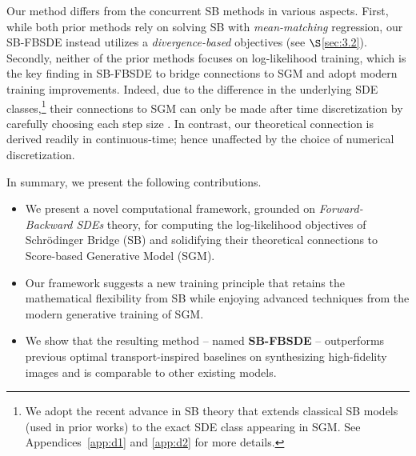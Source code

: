 \documentclass{article}
\begin{document}
{
  Our method differs from the concurrent SB methods \citep{de2021diffusion,vargas2021solving} in various aspects.
  First, while both prior methods rely on solving SB with
  \textit{mean-matching} regression,
  our {SB-FBSDE} instead utilizes a \textit{divergence-based} objectives
  (see $\S$\ref{sec:3.2}).
  Secondly, neither of the prior methods focuses on log-likelihood training,
  which is the key finding in {SB-FBSDE} to bridge connections to SGM and adopt modern training improvements.
  Indeed, due to the difference in the underlying SDE classes,\footnote{{
    We adopt the recent advance in SB theory \citep{caluya2021wasserstein} that extends classical SB models (used in prior works) to the exact SDE class appearing in SGM. See Appendices~\ref{app:d1} and \ref{app:d2} for more details.
  }}
  their connections to SGM can only be made after time discretization by carefully choosing each step size \citep{de2021diffusion}.
  In contrast, our theoretical connection is derived readily in continuous-time; hence unaffected by the choice of numerical discretization.

  
}


In summary, we present the following contributions.
\vspace{-6pt}
\begin{itemize}[leftmargin=13pt]
    \item We present a novel computational framework,
    grounded on \textit{Forward-Backward SDEs} theory,
    for computing the log-likelihood objectives of
    Schr{\"o}dinger Bridge (SB) and solidifying their theoretical connections to Score-based Generative Model (SGM).

    \item {Our framework suggests a new training principle that retains the mathematical flexibility from SB while enjoying advanced techniques from the modern generative training of SGM.}

    \item {We show that the resulting method -- named \textbf{SB-FBSDE} --
        outperforms previous optimal transport-inspired baselines on
        synthesizing high-fidelity images and is comparable to other existing models.}
\end{itemize}

\vspace{-10pt}
\end{document}
